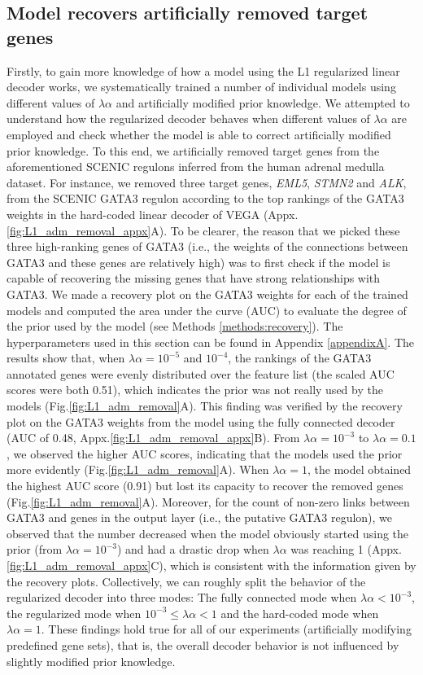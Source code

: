 \subsection{Model recovers artificially removed target genes}\label{sec:L1_adm_removed}
Firstly, to gain more knowledge of how a model using the L1 regularized linear decoder works, we systematically trained a number of individual models using different values of $\lambda\alpha$ and artificially modified prior knowledge. We attempted to understand how the regularized decoder behaves when different values of $\lambda\alpha$ are employed and check whether the model is able to correct artificially modified prior knowledge. To this end, we artificially removed target genes from the aforementioned SCENIC\cite{Aibar2017} regulons inferred from the human adrenal medulla dataset\cite{Jansky2021}. For instance, we removed three target genes, \textit{EML5}, \textit{STMN2} and \textit{ALK}, from the SCENIC GATA3 regulon according to the top rankings of the GATA3 weights in the hard-coded linear decoder of VEGA (Appx.\ref{fig:L1_adm_removal_appx}A). To be clearer, the reason that we picked these three high-ranking genes of GATA3 (i.e., the weights of the connections between GATA3 and these genes are relatively high) was to first check if the model is capable of recovering the missing genes that have strong relationships with GATA3. We made a recovery plot on the GATA3 weights for each of the trained models and computed the area under the curve (AUC) to evaluate the degree of the prior used by the model (see Methods \ref{methods:recovery}). The hyperparameters used in this section can be found in Appendix \ref{appendixA}. The results show that, when $\lambda\alpha = 10^{-5}$ and $10^{-4}$, the rankings of the GATA3 annotated genes were evenly distributed over the feature list (the scaled AUC scores were both 0.51), which indicates the prior was not really used by the models (Fig.\ref{fig:L1_adm_removal}A). This finding was verified by the recovery plot on the GATA3 weights from the model using the fully connected decoder (AUC of 0.48, Appx.\ref{fig:L1_adm_removal_appx}B). From $\lambda\alpha = 10^{-3}$ to $\lambda\alpha = 0.1$, we observed the higher AUC scores, indicating that the models used the prior more evidently (Fig.\ref{fig:L1_adm_removal}A). When $\lambda\alpha = 1$, the model obtained the highest AUC score (0.91) but lost its capacity to recover the removed genes (Fig.\ref{fig:L1_adm_removal}A). Moreover, for the count of non-zero links between GATA3 and genes in the output layer (i.e., the putative GATA3 regulon), we observed that the number decreased when the model obviously started using the prior (from $\lambda\alpha = 10^{-3}$) and had a drastic drop when $\lambda\alpha$ was reaching 1 (Appx.\ref{fig:L1_adm_removal_appx}C), which is consistent with the information given by the recovery plots. Collectively, we can roughly split the behavior of the regularized decoder into three modes: The fully connected mode when $\lambda\alpha < 10^{-3}$, the regularized mode when $10^{-3} \leq \lambda\alpha < 1$ and the hard-coded mode when $\lambda\alpha = 1$. These findings hold true for all of our experiments (artificially modifying predefined gene sets), that is, the overall decoder behavior is not influenced by slightly modified prior knowledge.


